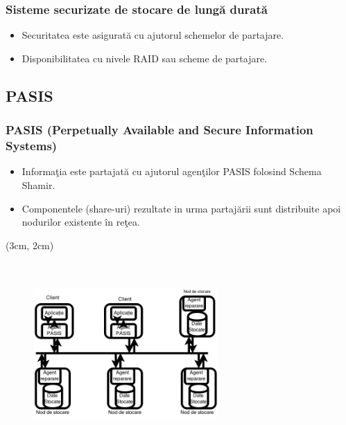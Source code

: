 \documentclass{beamer}
\theoremstyle{definition}
\begin{document}
\begin{frame}
    \frametitle{Sisteme securizate de stocare de lung\u{a} durat\u{a}}
    \begin{itemize}
        \item Securitatea este asigurat\u{a} cu ajutorul schemelor de partajare.
        \pause
        \item Disponibilitatea cu nivele RAID sau scheme de partajare. 
    \end{itemize}
\end{frame}


\subsection{PASIS}

\begin{frame}
    \frametitle{PASIS (Perpetually Available and  Secure Information Systems)}
     {
        \begin{itemize}
            \item Informa\c{t}ia este partajat\u{a} cu ajutorul agen\c{t}ilor PASIS folosind Schema Shamir.
            \pause
            \item Componentele (share-uri) rezultate in urma partaj\u{a}rii sunt distribuite apoi nodurilor existente \^{i}n re\c{t}ea.
        \end{itemize}
    }
     {
         \begin{textblock*}{4cm}(3cm, 2cm)
            \begin{figure}
                \includegraphics[width=7cm,height=7cm,keepaspectratio]{img/raid/PASIS.png}
           \end{figure}
        \end{textblock*}
    }
\end{frame}
\end{document}
